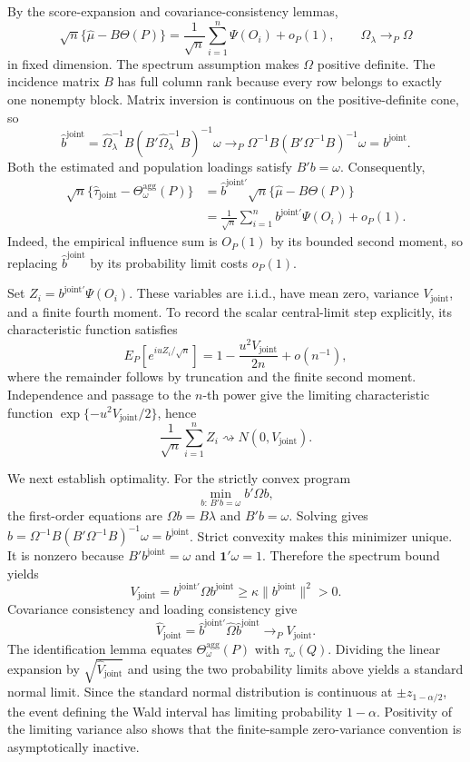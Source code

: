 By the score-expansion and covariance-consistency lemmas,
\[
 \sqrt n\{\widehat\mu-B\Theta(P)\}
 =\frac1{\sqrt n}\sum_{i=1}^n\Psi(O_i)+o_P(1),
 \qquad
 \widehat\Omega_\lambda\to_P\Omega
\]
in fixed dimension.  The spectrum assumption makes \(\Omega\) positive definite.  The incidence matrix \(B\) has full column rank because every row belongs to exactly one nonempty block.  Matrix inversion is continuous on the positive-definite cone, so
\[
 \widehat b^{\mathrm{joint}}
 =\widehat\Omega_\lambda^{-1}B
   (B'\widehat\Omega_\lambda^{-1}B)^{-1}\omega
 \to_P
 \Omega^{-1}B(B'\Omega^{-1}B)^{-1}\omega
 =b^{\mathrm{joint}}.
\]
Both the estimated and population loadings satisfy \(B'b=\omega\).  Consequently,
\[
\begin{aligned}
 \sqrt n\{\widehat\tau_{\mathrm{joint}}-\Theta_\omega^{\mathrm{agg}}(P)\}
 &=\widehat b^{\mathrm{joint}\prime}
   \sqrt n\{\widehat\mu-B\Theta(P)\}\\
 &=\frac1{\sqrt n}\sum_{i=1}^n
   b^{\mathrm{joint}\prime}\Psi(O_i)+o_P(1).
\end{aligned}
\]
Indeed, the empirical influence sum is \(O_P(1)\) by its bounded second moment, so replacing \(\widehat b^{\mathrm{joint}}\) by its probability limit costs \(o_P(1)\).

Set \(Z_i=b^{\mathrm{joint}\prime}\Psi(O_i)\).  These variables are i.i.d., have mean zero, variance \(V_{\mathrm{joint}}\), and a finite fourth moment.  To record the scalar central-limit step explicitly, its characteristic function satisfies
\[
 E_P[e^{iuZ_i/\sqrt n}]
 =1-\frac{u^2V_{\mathrm{joint}}}{2n}+o(n^{-1}),
\]
where the remainder follows by truncation and the finite second moment.  Independence and passage to the \(n\)-th power give the limiting characteristic function
\(\exp\{-u^2V_{\mathrm{joint}}/2\}\), hence
\[
 \frac1{\sqrt n}\sum_{i=1}^nZ_i\rightsquigarrow N(0,V_{\mathrm{joint}}).
\]

We next establish optimality.  For the strictly convex program
\[
 \min_{b:\,B'b=\omega} b'\Omega b,
\]
the first-order equations are \(\Omega b=B\lambda\) and \(B'b=\omega\).  Solving gives
\(b=\Omega^{-1}B(B'\Omega^{-1}B)^{-1}\omega=b^{\mathrm{joint}}\).  Strict convexity makes this minimizer unique.  It is nonzero because \(B'b^{\mathrm{joint}}=\omega\) and \(\mathbf 1'\omega=1\).  Therefore the spectrum bound yields
\[
 V_{\mathrm{joint}}
 =b^{\mathrm{joint}\prime}\Omega b^{\mathrm{joint}}
 \ge\kappa\|b^{\mathrm{joint}}\|^2>0.
\]
Covariance consistency and loading consistency give
\[
 \widehat V_{\mathrm{joint}}
 =\widehat b^{\mathrm{joint}\prime}\widehat\Omega
   \widehat b^{\mathrm{joint}}
 \to_PV_{\mathrm{joint}}.
\]
The identification lemma equates \(\Theta_\omega^{\mathrm{agg}}(P)\) with \(\tau_\omega(Q)\).  Dividing the linear expansion by \(\sqrt{\widehat V_{\mathrm{joint}}}\) and using the two probability limits above yields a standard normal limit.  Since the standard normal distribution is continuous at \(\pm z_{1-\alpha/2}\), the event defining the Wald interval has limiting probability \(1-\alpha\).  Positivity of the limiting variance also shows that the finite-sample zero-variance convention is asymptotically inactive.

